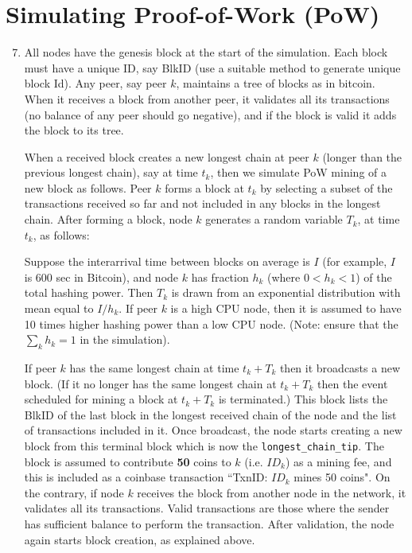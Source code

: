 \documentclass[12pt]{extarticle}
\begin{document}
\section*{Simulating Proof-of-Work (PoW)}
\begin{enumerate}
    \setcounter{enumi}{6} %
    \item All nodes have the genesis block at the start of the simulation. Each block must have a unique ID, say BlkID (use a suitable method to generate unique block Id). Any peer, say peer $k$, maintains a tree of blocks as in bitcoin. When it receives a block from another peer, it validates all its transactions (no balance of any peer should go negative), and if the block is valid it adds the block to its tree.

          When a received block creates a new longest chain at peer $k$ (longer than the previous longest chain), say at time $t_k$, then we simulate PoW mining of a new block as follows. Peer $k$ forms a block at $t_k$ by selecting a subset of the transactions received so far and not included in any blocks in the longest chain. After forming a block, node $k$ generates a random variable $T_k$, at time $t_k$, as follows:

          Suppose the interarrival time between blocks on average is $I$ (for example, $I$ is 600 sec in Bitcoin), and node $k$ has fraction $h_k$ (where $0 < h_k < 1$) of the total hashing power. Then $T_k$ is drawn from an exponential distribution with mean equal to $I/h_k$. If peer $k$ is a high CPU node, then it is assumed to have 10 times higher hashing power than a low CPU node. (Note: ensure that the $\sum_k h_k = 1$ in the simulation).

          If peer $k$ has the same longest chain at time $t_k + T_k$ then it broadcasts a new block. (If it no longer has the same longest chain at $t_k + T_k$ then the event scheduled for mining a block at $t_k + T_k$ is terminated.) This block lists the BlkID of the last block in the longest received chain of the node and the list of transactions included in it. Once broadcast, the node starts creating a new block from this terminal block which is now the \texttt{longest\_chain\_tip}. The block is assumed to contribute \textbf{50} coins to $k$ (i.e. $ID_k$) as a mining fee, and this is included as a coinbase transaction ``TxnID: $ID_k$ mines 50 coins". On the contrary, if node $k$ receives the block from another node in the network, it validates all its transactions. Valid transactions are those where the sender has sufficient balance to perform the transaction. After validation, the node again starts block creation, as explained above.


\end{enumerate}
\end{document}
